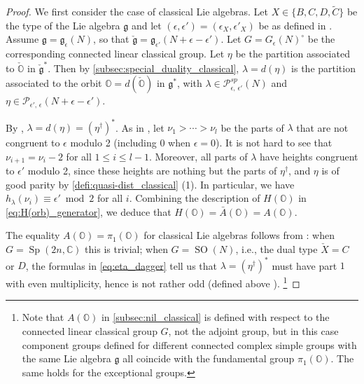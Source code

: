 \documentclass[11pt, a4paper]{amsart}
\newcommand{\C}{\mathbb{C}}
\newcommand{\g}{\mathfrak{g}}
\newcommand{\orb}{\mathbb{O}}
\newcommand{\fg}{\mathfrak{g}}
\newcommand{\ckfg}{{\check{\fg}}}
\newcommand{\ckorb}{\check{\orb}}
\newcommand{\cP}{\mathcal{P}}
\newcommand{\Abar}{\bar{A}}
\newcommand{\SO}{\operatorname{SO}}
\newcommand{\Sp}{\operatorname{Sp}}
\newcommand{\mC}{\widetilde{C}}
\newcommand{\Pee}{\cP^{sp}_{\epsilon,\,\epsilon'}}
\theoremstyle{definition}
\numberwithin{equation}{section}
\begin{document}
\begin{proof}

	We first consider the case of classical Lie algebras. Let $X \in \{B, C, D, \mC\}$ be the type of the Lie algebra $\g$ and let $(\epsilon, \epsilon') = (\epsilon_X, \epsilon'_X)$ be as defined in . Assume $\fg = \fg_{\epsilon}(N)$, so that $\ckfg = \fg_{\epsilon'}(N + \epsilon - \epsilon')$.
	Let $G = G_\epsilon(N)^\circ$ be the corresponding connected linear classical group. Let $\eta$ be the partition associated to $\ckorb$ in $\ckfg^*$. Then by \cref{subsec:special_duality_classical}, $\lambda = d(\eta)$ is the partition associated to the orbit $\orb = d(\ckorb)$ in $\g^*$, with $\lambda \in \Pee(N)$ and $\eta \in \cP_{\epsilon',\,\epsilon}(N + \epsilon - \epsilon')$.
	
	By , $\lambda = d(\eta) = (\eta^\dagger)^*$. As in , let $\nu_1 > \cdots > \nu_l$ be the parts of $\lambda$ that are not congruent to $\epsilon$ modulo 2 (including $0$ when $\epsilon=0$). It is not hard to see that $\nu_{i+1} = \nu_i - 2$ for all $1 \leqslant i \leqslant l-1$. Moreover, all parts of $\lambda$ have heights congruent to $\epsilon'$ modulo 2, since these heights are nothing but the parts of $\eta^\dagger$, and $\eta$ is of good parity by \cref{defi:quasi-dist_classical} (1). In particular, we have $h_\lambda(\nu_i) \equiv \epsilon' \bmod 2$ for all $i$.
	Combining the description of $H(\orb)$ in \eqref{eq:H(orb)_generator}, we deduce that $H(\orb) = \Abar(\orb) = A(\orb)$. 

	The equality $A(\orb) = \pi_1(\orb)$ for classical Lie algebras follows from \cite[Corollary 6.1.6]{CM}: when $G=\Sp(2n,\C)$ this is trivial; when $G=\SO(N)$, i.e., the dual type $\check{X} = C$ or $D$, the formulas in \eqref{eq:eta_dagger} tell us that $\lambda = (\eta^\dagger)^*$ must have part $1$ with even multiplicity, hence is not rather odd (defined above \cite[Corollary 6.1.6]{CM}).
	\footnote{Note that $A(\orb)$ in \cref{subsec:nil_classical} is defined with respect to the connected linear classical group $G$, not the adjoint group, but in this case component groups defined for different connected complex simple groups with the same Lie algebra $\fg$ all coincide with the fundamental group $\pi_1(\orb)$. The same holds for the exceptional groups.}


\end{proof}
\end{document}
